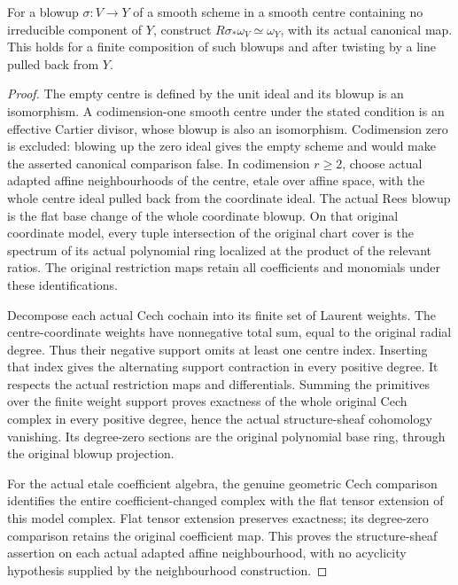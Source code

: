 \begin{lemma}
\label{lem:kn-nadel-smooth-blowup-canonical}
\notready
For a blowup $\sigma:V\to Y$ of a smooth scheme in a smooth centre
containing no irreducible component of $Y$,
construct $R\sigma_*\omega_V\simeq\omega_Y$, with its actual
canonical map.  This holds for a finite composition of such blowups
and after twisting by a line pulled back from $Y$.
\end{lemma}
\begin{proof}
The empty centre is defined by the unit ideal and its blowup is an
isomorphism. A codimension-one smooth centre under the stated condition
is an effective Cartier divisor, whose blowup is also an isomorphism.
Codimension zero is excluded: blowing up the zero ideal gives the empty
scheme and would make the asserted canonical comparison false.
In codimension $r\geq2$, choose actual adapted affine neighbourhoods
of the centre, etale over affine space, with the whole centre ideal
pulled back from the coordinate ideal.  The actual Rees blowup is the
flat base change of the whole coordinate blowup.  On that original
coordinate model, every tuple intersection of the original chart cover
is the spectrum of its actual polynomial ring localized at the product
of the relevant ratios.  The original restriction maps retain all
coefficients and monomials under these identifications.

Decompose each actual Cech cochain into its finite set of Laurent
weights.  The centre-coordinate weights have nonnegative total sum,
equal to the original radial degree.  Thus their negative support omits
at least one centre index.  Inserting that index gives the alternating
support contraction in every positive degree.  It respects the actual
restriction maps and differentials.  Summing the primitives over the
finite weight support proves exactness of the whole original Cech
complex in every positive degree, hence the actual structure-sheaf
cohomology vanishing.  Its degree-zero sections are the original
polynomial base ring, through the original blowup projection.

For the actual etale coefficient algebra, the genuine geometric Cech
comparison identifies the entire coefficient-changed complex with the
flat tensor extension of this model complex.  Flat tensor extension
preserves exactness; its degree-zero comparison retains the original
coefficient map.  This proves the structure-sheaf assertion on each
actual adapted affine neighbourhood, with no acyclicity hypothesis
supplied by the neighbourhood construction.


\end{proof}
